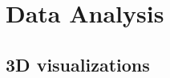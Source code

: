 \documentclass[letterpaper]{article}
\begin{document}

\section{Data Analysis}
\subsection{3D visualizations}

\end{document}
